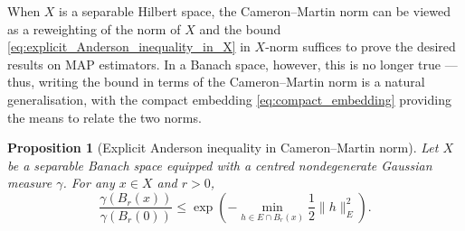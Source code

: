 \documentclass[11pt]{article}
\newcommand*{\cball}[2]{B_{#2}(#1)}
\renewcommand*{\leq}{\leqslant}
\newcommand*{\crcdfm}[3]{#1(\cball{#2}{#3})}
\theoremstyle{plain}
\newtheorem{proposition}[theorem]{Proposition}
\theoremstyle{definition}
\newcommand{\norm}[1]{\lVert #1 \rVert}
\numberwithin{equation}{section}
\numberwithin{figure}{section}
\numberwithin{table}{section}
\begin{document}
When $X$ is a separable Hilbert space, the Cameron--Martin norm can be viewed as a reweighting of the norm of $X$ and the bound \eqref{eq:explicit_Anderson_inequality_in_X} in $X$-norm suffices to prove the desired results on MAP estimators.
In a Banach space, however, this is no longer true --- thus, writing the bound in terms of the Cameron--Martin norm is a natural generalisation, with the compact embedding \eqref{eq:compact_embedding} providing the means to relate the two norms.

\begin{proposition}[Explicit Anderson inequality in Cameron--Martin norm]
	\label{prop:CM_bound}
	Let $X$ be a separable Banach space equipped with a centred nondegenerate Gaussian measure $\gamma$.
	For any $x \in X$ and $r > 0$,
	\begin{equation*}
		\frac{\crcdfm{\gamma}{x}{r}}{\crcdfm{\gamma}{0}{r}} \leq \exp\left(-\min_{h \in E \cap \cball{x}{r}} \frac{1}{2} \norm{h}_{E}^{2} \right).
	\end{equation*}
\end{proposition}
\end{document}
